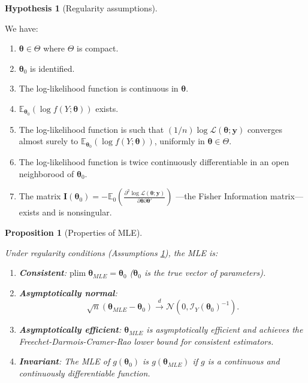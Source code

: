 \documentclass[
  12pt,
]{book}
\providecommand{\tightlist}{%
  \setlength{\itemsep}{0pt}\setlength{\parskip}{0pt}}
\newtheorem{proposition}{Proposition}[chapter]
\theoremstyle{definition}
\theoremstyle{definition}
\theoremstyle{definition}
\theoremstyle{definition}
\newtheorem{hypothesis}{Hypothesis}[chapter]
\theoremstyle{remark}
\begin{document}
\begin{hypothesis}[Regularity assumptions]
\protect\hypertarget{hyp:MLEregularity}{}\label{hyp:MLEregularity}

We have:

\begin{enumerate}
\def\labelenumi{\roman{enumi}.}
\tightlist
\item
  \(\boldsymbol\theta \in \Theta\) where \(\Theta\) is compact.
\item
  \(\boldsymbol\theta_0\) is identified.
\item
  The log-likelihood function is continuous in \(\boldsymbol\theta\).
\item
  \(\mathbb{E}_{\boldsymbol\theta_0}(\log f(Y;\boldsymbol\theta))\) exists.
\item
  The log-likelihood function is such that \((1/n)\log\mathcal{L}(\boldsymbol\theta;\mathbf{y})\) converges almost surely to \(\mathbb{E}_{\boldsymbol\theta_0}(\log f(Y;\boldsymbol\theta))\), uniformly in \(\boldsymbol\theta \in \Theta\).
\item
  The log-likelihood function is twice continuously differentiable in an open neighborood of \(\boldsymbol\theta_0\).
\item
  The matrix \(\mathbf{I}(\boldsymbol\theta_0) = - \mathbb{E}_0 \left( \frac{\partial^2 \log \mathcal{L}(\boldsymbol\theta;\mathbf{y})}{\partial \boldsymbol\theta \partial \boldsymbol\theta'}\right)\) ---the Fisher Information matrix--- exists and is nonsingular.
\end{enumerate}

\end{hypothesis}

\begin{proposition}[Properties of MLE]
\protect\hypertarget{prp:MLEproperties}{}\label{prp:MLEproperties}

Under regularity conditions (Assumptions \ref{hyp:MLEregularity}), the MLE is:

\begin{enumerate}
\def\labelenumi{\alph{enumi}.}
\tightlist
\item
  \textbf{Consistent}: \(\mbox{plim}\; \boldsymbol\theta_{MLE} = {\boldsymbol\theta}_0\) (\({\boldsymbol\theta}_0\) is the true vector of parameters).
\item
  \textbf{Asymptotically normal}:
  \begin{equation}
  \boxed{\sqrt{n}(\boldsymbol\theta_{MLE} - \boldsymbol\theta_{0}) \overset{d}{\rightarrow} \mathcal{N}(0,\mathcal{I}_Y(\boldsymbol\theta_0)^{-1}).} \label{eq:normMLE}
  \end{equation}
\item
  \textbf{Asymptotically efficient}: \(\boldsymbol\theta_{MLE}\) is asymptotically efficient and achieves the Freechet-Darmois-Cramer-Rao lower bound for consistent estimators.
\item
  \textbf{Invariant}: The MLE of \(g(\boldsymbol\theta_0)\) is \(g(\boldsymbol\theta_{MLE})\) if \(g\) is a continuous and continuously differentiable function.
\end{enumerate}

\end{proposition}
\end{document}
